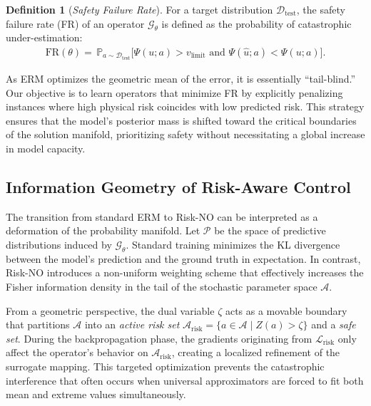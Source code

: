 \documentclass{article}
\theoremstyle{plain}
\theoremstyle{definition}
\newtheorem{definition}[theorem]{Definition}
\theoremstyle{remark}
\begin{document}
\begin{definition}[\textit{Safety Failure Rate}]
For a target distribution $\mathcal{D}_{\text{test}}$, the safety failure rate (FR) of an operator $\mathcal{G}_\theta$ is defined as the probability of catastrophic under-estimation:
\begin{equation}
\begin{aligned}
    \text{FR}(\theta)
    =\,
    \mathbb{P}_{a \sim \mathcal{D}_{\text{test}}} \Big[
       \Psi(u; a) > v_{\text{limit}} \text{ and } \Psi(\hat{u}; a) < \Psi(u; a)
    \Big].
\end{aligned}
\end{equation}
\end{definition}

As ERM optimizes the geometric mean of the error, it is essentially ``tail-blind.'' Our objective is to learn operators that minimize FR by explicitly penalizing instances where high physical risk coincides with low predicted risk. This strategy ensures that the model's posterior mass is shifted toward the critical boundaries of the solution manifold, prioritizing safety without necessitating a global increase in model capacity.

\subsection{Information Geometry of Risk-Aware Control}
\label{sec:geom_risk}

The transition from standard ERM to Risk-NO can be interpreted as a deformation of the probability manifold. Let $\mathcal{P}$ be the space of predictive distributions induced by $\mathcal{G}_\theta$. Standard training minimizes the KL divergence between the model's prediction and the ground truth in expectation. In contrast, Risk-NO introduces a non-uniform weighting scheme that effectively increases the Fisher information density in the tail of the stochastic parameter space $\mathcal{A}$.

From a geometric perspective, the dual variable $\zeta$ acts as a movable boundary that partitions $\mathcal{A}$ into an \textit{active risk set} $\mathcal{A}_{\text{risk}} = \{ a \in \mathcal{A} \mid Z(a) > \zeta \}$ and a \textit{safe set}. During the backpropagation phase, the gradients originating from $\mathcal{L}_{\text{risk}}$ only affect the operator's behavior on $\mathcal{A}_{\text{risk}}$, creating a localized refinement of the surrogate mapping. This targeted optimization prevents the catastrophic interference that often occurs when universal approximators are forced to fit both mean and extreme values simultaneously.
\end{document}
